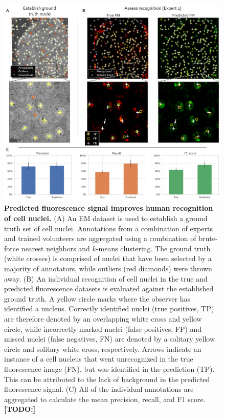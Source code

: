 

\begin{figure}[!tbh]
    \centering
    \includegraphics[width=\linewidth]{chapter-4/figures/fig3_counting_v3.pdf}
    \caption{\textbf{Predicted fluorescence signal improves human recognition of cell nuclei.}
    (A) An EM dataset is used to establish a ground truth set of cell nuclei. Annotations from a combination of experts and trained volunteers are aggregated using a combination of brute-force nearest neighbors and $k$-means clustering. The ground truth (white crosses) is comprised of nuclei that have been selected by a majority of annotators, while outliers (red diamonds) were thrown away.
    (B) An individual recognition of cell nuclei in the true and predicted fluorescence datasets is evaluated against the established ground truth. A yellow circle marks where the observer has identified a nucleus. Correctly identified nuclei (true positives, TP) are therefore denoted by an overlapping white cross and yellow circle, while incorrectly marked nuclei (false positives, FP) and missed nuclei (false negatives, FN) are denoted by a solitary yellow circle and solitary white cross, respectively. Arrows indicate an instance of a cell nucleus that went unrecognized in the true fluorescence image (FN), but was identified in the prediction (TP). This can be attributed to the lack of background in the predicted fluorescence signal.
    (C) All of the individual annotations are aggregated to calculate the mean precision, recall, and F1 score.
    \textbf{[TODO:]}}
    \label{fig:4.3_counting}
\end{figure}



